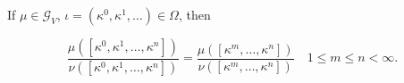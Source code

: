 If $\mu \in \mathcal{G}_V$, $\iota = (\kappa^0, \kappa^1, \ldots) \in \Omega$, then

$$\frac{\mu([\kappa^0, \kappa^1, \ldots, \kappa^n])}{\nu([\kappa^0, \kappa^1, \ldots, \kappa^n])} = \frac{\mu([\kappa^m, \ldots, \kappa^n])}{\nu([\kappa^m, \ldots, \kappa^n])} \quad 1 \leq m \leq n < \infty.$$
